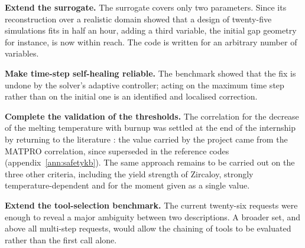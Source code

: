\textbf{Extend the surrogate.} The surrogate covers only two parameters. Since
its reconstruction over a realistic domain showed that a design of twenty-five
simulations fits in half an hour, adding a third variable, the initial gap
geometry for instance, is now within reach. The code is written for an
arbitrary number of variables.

\textbf{Make time-step self-healing reliable.} The benchmark showed that the fix
is undone by the solver's adaptive controller; acting on the maximum time step
rather than on the initial one is an identified and localised correction.

\textbf{Complete the validation of the thresholds.} The correlation for the
decrease of the melting temperature with burnup was settled at the end of the
internship by returning to the literature : the value carried by the project came
from the MATPRO correlation, since superseded in the reference codes
(appendix~\ref{ann:safetykb}). The same approach remains to be carried out on the
three other criteria, including the yield strength of Zircaloy, strongly
temperature-dependent and for the moment given as a single value.

\textbf{Extend the tool-selection benchmark.} The current twenty-six requests
were enough to reveal a major ambiguity between two descriptions. A broader set,
and above all multi-step requests, would allow the chaining of tools to be
evaluated rather than the first call alone.

\clearpage
